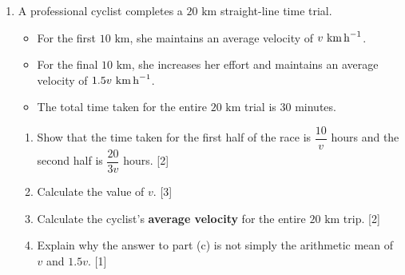 \documentclass[12pt, twoside]{article}
\begin{document}
\begin{enumerate}[itemsep=0.5cm]
\newpage

\item A professional cyclist completes a $20 \text{ km}$ straight-line time trial.
\begin{itemize}[itemsep=0.1cm]
  \item For the first $10 \text{ km}$, she maintains an average velocity of $v \text{ km\,h}^{-1}$.
  \item For the final $10 \text{ km}$, she increases her effort and maintains an average velocity of $1.5v \text{ km\,h}^{-1}$.
  \item The total time taken for the entire $20 \text{ km}$ trial is 30 minutes.
\end{itemize}
\begin{enumerate}[itemsep=0.15cm]
  \item Show that the time taken for the first half of the race is $\dfrac{10}{v}$ hours
        and the second half is $\dfrac{20}{3v}$ hours. \hfill [2]
  \item Calculate the value of $v$. \hfill [3]
  \item Calculate the cyclist's \textbf{average velocity} for the entire $20 \text{ km}$ trip. \hfill [2]
  \item Explain why the answer to part (c) is not simply the arithmetic mean
        of $v$ and $1.5v$. \hfill [1]
\end{enumerate}

\end{enumerate}
\end{document}
